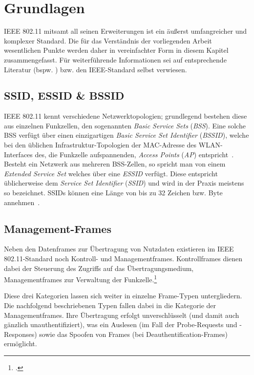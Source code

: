 \section{Grundlagen}\label{sec:grundlagen}
IEEE 802.11 mitsamt all seinen Erweiterungen ist ein äußerst umfangreicher und komplexer Standard. Die für das Verständnis der vorliegenden Arbeit wesentlichen Punkte werden daher in vereinfachter Form in diesem Kapitel zusammengefasst. Für weiterführende Informationen sei auf entsprechende Literatur (bspw. \cite{rechWLAN}) bzw. den IEEE-Standard selbst verwiesen.

\subsection{SSID, ESSID \& BSSID}
IEEE 802.11 kennt verschiedene Netzwerktopologien; grundlegend bestehen diese aus einzelnen Funkzellen, den sogenannten \textit{Basic Service Sets} (\textit{BSS}). 
Eine solche BSS verfügt über einen einzigartigen \textit{Basic Service Set Identifier} (\textit{BSSID}), welche bei den üblichen Infrastruktur-Topologien der MAC-Adresse des WLAN-Interfaces des, die Funkzelle aufspannenden, \textit{Access Points} (\textit{AP}) entspricht~\cite[S. 51]{rechWLAN}. 
Besteht ein Netzwerk aus mehreren BSS-Zellen, so spricht man von einem \textit{Extended Service Set} welches über eine \textit{ESSID} verfügt. 
Diese entspricht üblicherweise dem \textit{Service Set Identifier} (\textit{SSID}) und wird in der Praxis meistens so bezeichnet. 
SSIDs können eine Länge von bis zu 32 Zeichen bzw. Byte annehmen~\cite{netgearESSID}.

\subsection{Management-Frames}
Neben den Datenframes zur Übertragung von Nutzdaten existieren im IEEE 802.11-Standard noch Kontroll- und Managementframes. Kontrollframes dienen dabei der Steuerung des Zugriffs auf das Übertragungsmedium, Managementframes zur Verwaltung der Funkzelle.\footcite[S. 180]{rechWLAN}

Diese drei Kategorien lassen sich weiter in einzelne Frame-Typen untergliedern. Die nachfolgend beschriebenen Typen fallen dabei in die Kategorie der Managementframes. Ihre Übertragung erfolgt unverschlüsselt (und damit auch gänzlich unauthentifiziert), was ein Auslesen (im Fall der Probe-Requests und -Responses) sowie das Spoofen von Frames (bei Deauthentification-Frames) ermöglicht.

